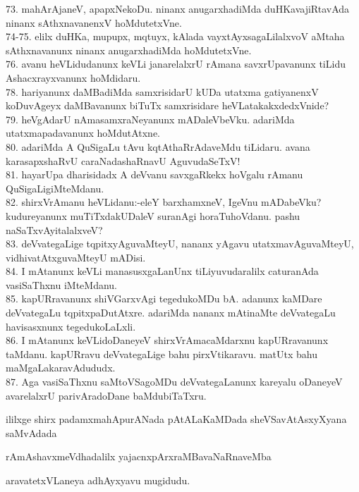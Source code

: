 \documentclass{article}
\begin{document}
73. mahArAjaneV, apapxNekoDu. ninanx anugarxhadiMda duHKavajiRtavAda ninanx sAthxnavanenxV hoMdutetxVne.\\
74-75. elilx duHKa, mupupx, mqtuyx, kAlada vayxtAyxsagaLilalxvoV aMtaha sAthxnavanunx ninanx anugarxhadiMda hoMdutetxVne.\\
76. avanu heVLidudanunx keVLi janarelalxrU rAmana savxrUpavanunx tiLidu Ashacxrayxvanunx hoMdidaru.\\
78. hariyanunx daMBadiMda samxrisidarU kUDa utatxma gatiyanenxV koDuvAgeyx daMBavanunx biTuTx samxrisidare heVLatakakxdedxVnide?\\
79. heVgAdarU nAmasamxraNeyanunx mADaleVbeVku. adariMda utatxmapadavanunx hoMdutAtxne.\\
80. adariMda A QuSigaLu tAvu kqtAthaRrAdaveMdu tiLidaru. avana karasapxshaRvU caraNadashaRnavU AguvudaSeTxV!\\
81. hayarUpa dharisidadx A deVvanu savxgaRkekx hoVgalu rAmanu QuSigaLigiMteMdanu.\\
82. shirxVrAmanu heVLidanu:-eleY barxhamxneV, IgeVnu mADabeVku? kudureyanunx muTiTxdakUDaleV suranAgi horaTuhoVdanu. pashu naSaTxvAyitalalxveV?\\
83. deVvategaLige tqpitxyAguvaMteyU, nananx yAgavu utatxmavAguvaMteyU, vidhivatAtxguvaMteyU mADisi.\\
84. I mAtanunx keVLi manasusxgaLanUnx tiLiyuvudaralilx caturanAda vasiSaThxnu iMteMdanu.\\
85. kapURravanunx shiVGarxvAgi tegedukoMDu bA. adanunx kaMDare deVvategaLu tqpitxpaDutAtxre. adariMda nananx mAtinaMte deVvategaLu havisasxnunx tegedukoLaLxli.\\
86. I mAtanunx keVLidoDaneyeV shirxVrAmacaMdarxnu kapURravanunx taMdanu. kapURravu deVvategaLige bahu pirxVtikaravu. matUtx bahu maMgaLakaravAdududx.\\
87. Aga vasiSaThxnu saMtoVSagoMDu deVvategaLanunx kareyalu oDaneyeV avarelalxrU parivAradoDane baMdubiTaTxru.\\

\begin{center}
ililxge shirx padamxmahApurANada pAtALaKaMDada sheVSavAtAsxyXyana saMvAdada
\end{center}

\begin{center}
rAmAshavxmeVdhadalilx yajacnxpArxraMBavaNaRnaveMba
\end{center}

\begin{center}
aravatetxVLaneya adhAyxyavu mugidudu.
\end{center}
\end{document}
